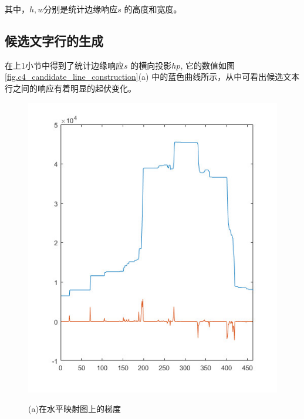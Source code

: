         其中，$h,w$分别是统计边缘响应$s$ 的高度和宽度。

        \subsection{候选文字行的生成}

        在上1小节中得到了统计边缘响应$s$ 的横向投影$hp$, 它的数值如图\ref{fig.c4_candidate_line_construction}(a) 中的蓝色曲线所示，从中可看出候选文本行之间的响应有着明显的起伏变化。

        \begin{figure}[htbp]
        \begin{minipage}[t]{0.32\linewidth}
        \centering
        \includegraphics[width=\textwidth]{./figures/c4_gradient.jpg}
        \centerline{\small (a)在水平映射图上的梯度}
        \end{minipage}
        \begin{minipage}[t]{0.32\linewidth}
        \centering

\end{minipage}
\end{figure}
